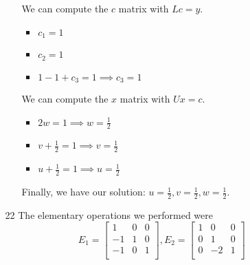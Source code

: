 \documentclass[12pt,letterpaper]{article}
\begin{document}
\begin{enumerate}
\begin{enumerate}
\begin{itemize}
              We can compute the $c$ matrix with $Lc = y$.
              \begin{itemize}
                \item $c_1 = 1$
                \item $c_2 = 1$
                \item $1 - 1 + c_3 = 1 \implies c_3 = 1$
              \end{itemize}

              We can compute the $x$ matrix with $Ux = c$.
              \begin{itemize}
                \item $2w              = 1 \implies w = \frac{1}{2}$
                \item $v + \frac{1}{2} = 1 \implies v = \frac{1}{2}$
                \item $u + \frac{1}{2} = 1 \implies u = \frac{1}{2}$
              \end{itemize}

              Finally, we have our solution: $u = \frac{1}{2}, v = \frac{1}{2}, w = \frac{1}{2}$.
          \end{itemize}
        \item [22]
          The elementary operations we performed were
          \[
            E_1 =
            \begin{bmatrix}
               1 &  0 &  0 \\
              -1 &  1 &  0 \\
              -1 &  0 &  1 \\
            \end{bmatrix}
            ,
            E_2 =
            \begin{bmatrix}
               1 &  0 &  0 \\
               0 &  1 &  0 \\
               0 & -2 &  1 \\
            \end{bmatrix}
          \]


\end{enumerate}
\end{enumerate}
\end{document}
